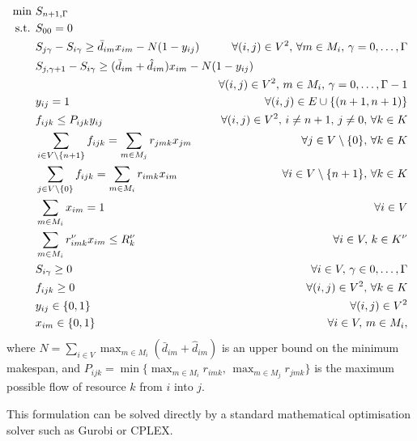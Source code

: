 \documentclass[a4paper,abstracton]{scrartcl}
\begin{document}
\begin{align}
\min \ & S_{n+1,\Gamma}\label{eqn:compact1}\\
\text{s.t. } & S_{00}=0\label{eqn:compact2}\\
	     & S_{j\gamma} - S_{i\gamma} \geq \bar{d}_{im}x_{im} - N(1-y_{ij}) & \hspace{-5cm}\forall (i,j)\in V^2,\,\forall m\in M_i,\,\gamma=0,\dots,\Gamma\label{eqn:compact_bigM1}\\
	     & S_{j,\gamma+1} - S_{i\gamma} \geq (\bar{d}_{im} + \hat{d}_{im})x_{im} - N(1-y_{ij})\nonumber \\
	     &&\hspace{-5cm} \forall (i,j)\in V^2,\, m\in M_i,\,\gamma = 0,\dots,\Gamma-1\label{eqn:compact_bigM2}\\
	     & y_{ij}=1 & \forall (i,j) \in E\cup\{(n+1,n+1)\}\label{eqn:compact5}\\
	     & f_{ijk}\leq P_{ijk}y_{ij} & \hspace{-5cm}\forall (i,j)\in V^2,\,i\neq n+1,\,j\neq0,\, \forall k \in K\label{eqn:compact6}\\
	     & \sum_{i\in V\setminus\{n+1\}}f_{ijk}=\sum_{m\in M_j}r_{jmk}x_{jm} & \forall j \in V\setminus\{0\} ,\, \forall k\in K\label{eqn:compact7}\\
	     & \sum_{j\in V\setminus\{0\}}f_{ijk}=\sum_{m\in M_i}r_{imk}x_{im} & \forall i \in V\setminus\{n+1\},\,\forall k\in K\label{eqn:compact8}\\
	     & \sum_{m\in M_i}x_{im} = 1 & \forall i\in V\label{eqn:compact9}\\
	     & \sum_{m\in M_i}r^{\nu}_{imk}x_{im} \leq R^{\nu}_k & \forall i \in V,\,k\in K^{\nu}\\
	     & S_{i\gamma}\geq 0 &\forall i\in V,\,\gamma \in 0,\dots, \Gamma\label{eqn:compact10}\\
	     & f_{ijk}\geq 0 & \forall (i,j)\in V^2 ,\, \forall k \in K\label{eqn:compact11}\\
	     & y_{ij}\in\{0,1\} & \forall (i,j)\in V^2\label{eqn:compact12}\\
	     & x_{im}\in\{0,1\} & \forall i\in V,\,m\in M_i,
\end{align}
where $N=\sum_{i\in V}\max_{m\in M_i}(\bar{d}_{im}+\hat{d}_{im})$ is an upper bound on the minimum makespan, and $P_{ijk}=\min\{\max_{m\in M_i}r_{imk},\,\max_{m\in M_j} r_{jmk}\}$ is the maximum possible flow of resource $k$ from $i$ into $j$.

This formulation can be solved directly by a standard mathematical optimisation solver such as Gurobi or CPLEX.
\end{document}
